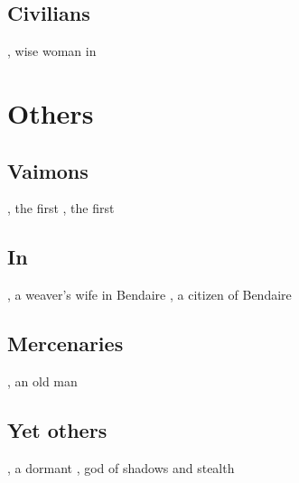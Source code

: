 \subsection{Civilians}
\begin{dramatispersonae}
  , wise woman in 
\end{dramatispersonae}




\section{Others}
\subsection{Vaimons}
\begin{dramatispersonae}
  , the first 
  , 
    the first 
  \dramdead[Vizicar]{\VizicarDurasRespina}{\human}{\male}
\end{dramatispersonae}
\subsection[In Bendaire]{In }
\begin{dramatispersonae}
  , a weaver's wife in Bendaire
  , a citizen of Bendaire
\end{dramatispersonae}
\subsection{Mercenaries}
\begin{dramatispersonae}
  , an old man
\end{dramatispersonae}
\subsection{Yet others}
\begin{dramatispersonae}
  \dramitem[Shiaraid]{\Shiaraid}{\malach}{\female}, a dormant 
  \dramitem[Nasshikerr]{\Nasshikerr}{\Taortha}{\male}, \Ortaican god of shadows and stealth 
\end{dramatispersonae}







